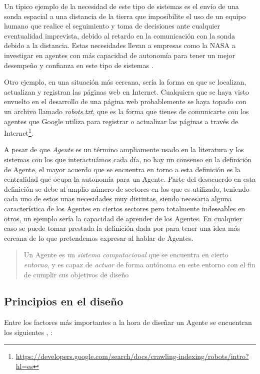 Un típico ejemplo de la necesidad de este tipo de sistemas es el envío de una sonda espacial a una distancia de la tierra que imposibilite el uso de un equipo humano que realice el seguimiento y toma de decisiones ante cualquier eventualidad imprevista, debido al retardo en la comunicación con la sonda debido a la distancia. Estas necesidades llevan a empresas como la NASA a investigar en agentes con más capacidad de autonomía para tener un mejor desempeño y confianza en este tipo de sistemas \citep{rouff2002autonomy}.

Otro ejemplo, en una situación más cercana, sería la forma en que se localizan, actualizan y registran las páginas web en Internet. Cualquiera que se haya visto envuelto en el desarrollo de una página web probablemente se haya topado con un archivo llamado \textit{robots.txt}, que es la forma que tienes de comunicarte con los agentes que Google utiliza para registrar o actualizar las páginas a través de Internet\footnote{\url{https://developers.google.com/search/docs/crawling-indexing/robots/intro?hl=es}}.

A pesar de que \textit{Agente} es un término ampliamente usado en la literatura y los sistemas con los que interactuámos cada día, no hay un consenso en la definición de Agente, el mayor acuerdo que se encuentra en torno a esta definición es la centralidad que ocupa la autonomía para un Agente. Parte del desacuerdo en esta definición se debe al amplio número de sectores en los que es utilizado, teniendo cada uno de estos unas necesidades muy distintas, siendo necesaria alguna característica de los Agentes en ciertos sectores pero totalmente indeseables en otros, un ejemplo sería la capacidad de aprender de los Agentes. En cualquier caso se puede tomar prestada la definición dada por \cite{weiss1999multiagent} para tener una idea más cercana de lo que pretendemos expresar al hablar de Agentes.

\begin{quote}
Un Agente es un \textit{sistema computacional} que se encuentra en cierto \textit{entorno}, y es capaz de \textit{actuar} de forma autónoma en este entorno con el fin de cumplir sus objetivos de diseño
\end{quote}

\subsection{Principios en el diseño}

Entre los factores más importantes a la hora de diseñar un Agente se encuentran los siguientes \citep{russell2016artificial}, \citep{wooldridge2009introduction}:

